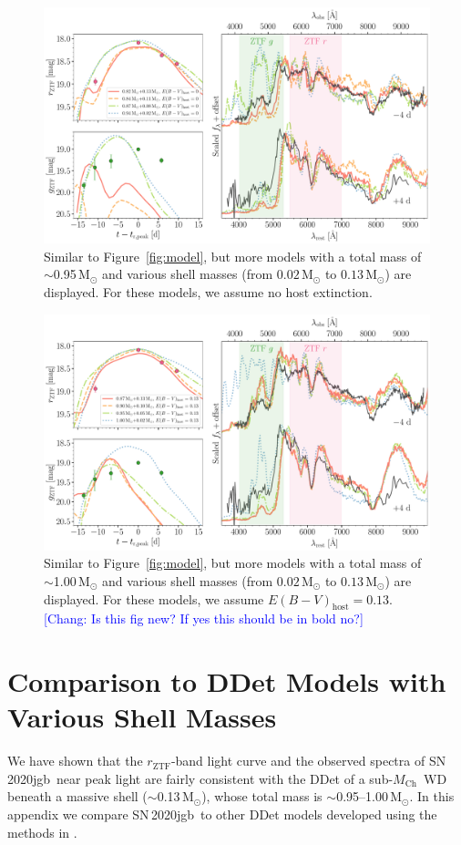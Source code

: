 \documentclass[twocolumn]{aastex631}
\newcommand{\sn}{SN\,2020jgb}
\newcommand{\Mch}{$M_\mathrm{Ch}$}
\newcommand{\Msun}{\mathrm{M_\odot}}
\newcommand{\chang}[1]{\textcolor{blue}{[Chang: #1]}}
\begin{document}
\appendix
\begin{figure}
    \centering
    \includegraphics[width=\textwidth]{model_0_95.pdf}
    \caption{Similar to Figure~\ref{fig:model}, but more models with a total mass of $\sim$0.95\,$\Msun$ and various shell masses (from $0.02\,\Msun$ to $0.13\,\Msun$) are displayed. For these models, we assume no host extinction.}
    \label{fig:model_0_95}
\end{figure}

\begin{figure}
    \centering
    \includegraphics[width=\textwidth]{model_1_0.pdf}
    \caption{Similar to Figure~\ref{fig:model}, but more models with a total mass of $\sim$1.00\,$\Msun$ and various shell masses (from $0.02\,\Msun$ to $0.13\,\Msun$) are displayed. For these models, we assume $E(B-V)_\mathrm{host}=0.13$. \chang{Is this fig new? If yes this should be in bold no?}}
    \label{fig:model_1_0}
\end{figure}

\section{Comparison to DDet Models with Various Shell Masses}\label{app1}
We have shown that the $r_\mathrm{ZTF}$-band light curve and the observed spectra of \sn\ near peak light are fairly consistent with the DDet of a sub-\Mch\ WD beneath a massive shell ($\sim$0.13\,$\Msun$), whose total mass is $\sim$0.95--1.00\,$\Msun$. In this appendix we compare \sn\ to other DDet models developed using the methods in \citet{polin_observational_2019}. 
\end{document}
